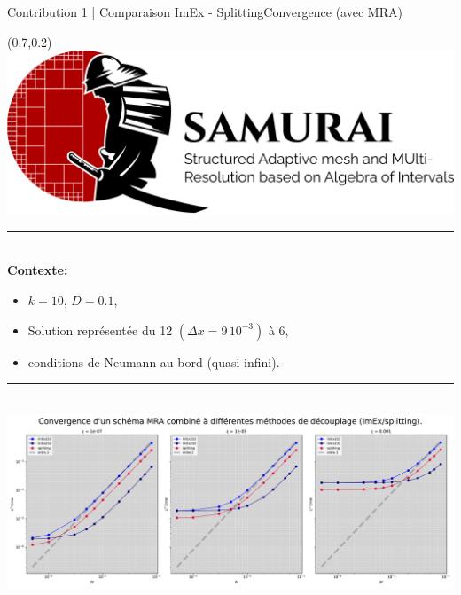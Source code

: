 \begin{frame}{Contribution 1 | Comparaison ImEx - Splitting}{Convergence (avec MRA)}
    \begin{textblock*}{40pt}(0.7\paperwidth,0.2\paperheight)
        \includegraphics[scale=.03]{medias/2_/1_/light_logo.png}
    \end{textblock*}
    \noindent\color{Primary}\rule{\linewidth}{0.6pt}\color{black}\\
    \textbf{Contexte:\\}
    \begin{itemize}
        \item $k=10$, $D=0.1$,
        \item Solution représentée du 12 $(\Delta x = 9\, 10^{-3})$ à 6,
        \item conditions de Neumann au bord (quasi infini).
    \end{itemize}   
    \noindent\color{Primary}\rule{\linewidth}{0.6pt}\color{black}\\

    \centering\includegraphics[width = .8\textwidth]{ medias/2_/1_/couplage_MRA_temps_k10_D01.pdf }
\end{frame}